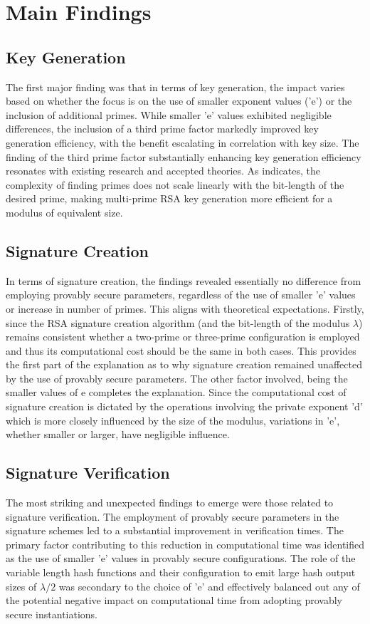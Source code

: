 \documentclass[]{final_report}
\theoremstyle{definition}
\begin{document}
\section{Main Findings}

\subsection{Key Generation}
The first major finding was that in terms of key generation, the impact varies based on whether the focus is on the use of smaller exponent values ('e') or the inclusion of additional primes.  While smaller 'e' values exhibited negligible differences, the inclusion of a third prime factor markedly improved key generation efficiency, with the benefit escalating in correlation with key size. The finding of the third prime factor substantially enhancing key generation efficiency resonates with existing research and accepted theories. As \cite{Hinek+2008+117+147} indicates, the complexity of finding primes does not scale linearly with the bit-length of the desired prime, making multi-prime RSA key generation more efficient for a modulus of equivalent size.

\subsection{Signature Creation}
In terms of signature creation, the findings revealed essentially no difference from employing provably secure parameters, regardless of the use of smaller 'e' values or increase in number of primes. This aligns with theoretical expectations. Firstly, since the RSA signature creation algorithm (and the bit-length of the modulus $\lambda$) remains consistent whether a two-prime or three-prime configuration is employed and thus its computational cost should be the same in both cases. This provides the first part of the explanation as to why signature creation remained unaffected by the use of provably secure parameters. 
The other factor involved, being the smaller values of e completes the explanation. Since the computational cost of signature creation is dictated by the operations involving the private exponent 'd' which is more closely influenced by the size of the modulus, variations in 'e', whether smaller or larger, have negligible influence. 


\subsection{Signature Verification}
The most striking and unexpected findings to emerge were those related to signature verification. The employment of provably secure parameters in the signature schemes led to a substantial improvement in verification times. The primary factor contributing to this reduction in computational time was identified as the use of smaller 'e' values in provably secure configurations. The role of the variable length hash functions and their configuration to emit large hash output sizes of $\lambda / 2$ was secondary to the choice of 'e' and effectively balanced out any of the potential negative impact on computational time from adopting provably secure instantiations. 
\end{document}
